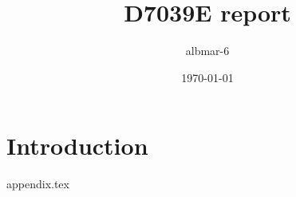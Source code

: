 \documentclass{book}
\title{D7039E report}
\author{albmar-6}
\date{\today}
\begin{document}
\maketitle

\section{Introduction}
{appendix.tex}
\end{document}
